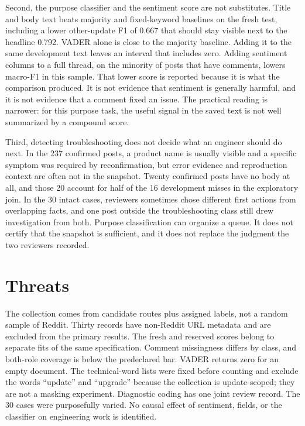 \documentclass[conference,letterpaper]{IEEEtran}
\begin{document}
Second, the purpose classifier and the sentiment score are not substitutes. Title and body text beats majority and fixed-keyword baselines on the fresh test, including a lower other-update F1 of 0.667 that should stay visible next to the headline 0.792. VADER alone is close to the majority baseline. Adding it to the same development text leaves an interval that includes zero. Adding sentiment columns to a full thread, on the minority of posts that have comments, lowers macro-F1 in this sample. That lower score is reported because it is what the comparison produced. It is not evidence that sentiment is generally harmful, and it is not evidence that a comment fixed an issue. The practical reading is narrower: for this purpose task, the useful signal in the saved text is not well summarized by a compound score.

Third, detecting troubleshooting does not decide what an engineer should do next. In the 237 confirmed posts, a product name is usually visible and a specific symptom was required by reconfirmation, but error evidence and reproduction context are often not in the snapshot. Twenty confirmed posts have no body at all, and those 20 account for half of the 16 development misses in the exploratory join. In the 30 intact cases, reviewers sometimes chose different first actions from overlapping facts, and one post outside the troubleshooting class still drew investigation from both. Purpose classification can organize a queue. It does not certify that the snapshot is sufficient, and it does not replace the judgment the two reviewers recorded.

\section{Threats}
The collection comes from candidate routes plus assigned labels, not a random sample of Reddit. Thirty records have non-Reddit URL metadata and are excluded from the primary results. The fresh and reserved scores belong to separate fits of the same specification. Comment missingness differs by class, and both-role coverage is below the predeclared bar. VADER returns zero for an empty document. The technical-word lists were fixed before counting and exclude the words ``update'' and ``upgrade'' because the collection is update-scoped; they are not a masking experiment. Diagnostic coding has one joint review record. The 30 cases were purposefully varied. No causal effect of sentiment, fields, or the classifier on engineering work is identified.
\end{document}
